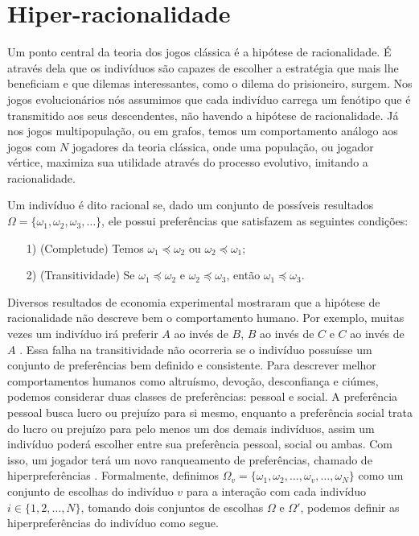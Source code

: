 \chapter{Hiper-racionalidade} \label{chap:hiperRacionalidade}

Um ponto central da teoria dos jogos clássica é a hipótese de racionalidade. É através dela que os indivíduos são capazes de escolher a estratégia que mais lhe beneficiam e que dilemas interessantes, como o dilema do prisioneiro, surgem. Nos jogos evolucionários nós assumimos que cada indivíduo carrega um fenótipo que é transmitido aos seus descendentes, não havendo a hipótese de racionalidade. Já nos jogos multipopulação, ou em grafos, temos um comportamento análogo aos jogos com $N$ jogadores da teoria clássica, onde uma população, ou jogador vértice, maximiza sua utilidade através do processo evolutivo, imitando a racionalidade.

\begin{definition}
    \label{defRacionalidade}
    Um indivíduo é dito racional se, dado um conjunto de possíveis resultados $\Omega=\{\omega_1,\omega_2,\omega_3,\dots\}$, ele possui preferências que satisfazem as seguintes condições:
    \begin{itemize}
        \item[1)] (Completude) Temos $\omega_1\preceq\omega_2$ ou $\omega_2\preceq\omega_1$;
        \item[2)] (Transitividade) Se $\omega_1\preceq\omega_2$ e $\omega_2\preceq\omega_3$, então $\omega_1\preceq\omega_3$.
    \end{itemize}
\end{definition}

Diversos resultados de economia experimental mostraram que a hipótese de racionalidade não descreve bem o comportamento humano. Por exemplo, muitas vezes um indivíduo irá preferir $A$ ao invés de $B$, $B$ ao invés de $C$ e $C$ ao invés de $A$ \cite{sep-game-evolutionary}. Essa falha na transitividade não ocorreria se o indivíduo possuísse um conjunto de preferências bem definido e consistente. Para descrever melhor comportamentos humanos como altruísmo, devoção, desconfiança e ciúmes, podemos considerar duas classes de preferências: pessoal e social. A preferência pessoal busca lucro ou prejuízo para si mesmo, enquanto a preferência social trata do lucro ou prejuízo para pelo menos um dos demais indivíduos, assim um indivíduo poderá escolher entre sua preferência pessoal, social ou ambas. Com isso, um jogador terá um novo ranqueamento de preferências, chamado de hiperpreferências \cite{askari2019behavioral}. Formalmente, definimos $\Omega_v=\{\omega_1,\omega_2,\dots,\omega_v,\dots,\omega_N\}$ como um conjunto de escolhas do indivíduo $v$ para a interação com cada indivíduo $i\in\{1,2,\dots,N\}$, tomando dois conjuntos de escolhas $\Omega$ e $\Omega'$, podemos definir as hiperpreferências do indivíduo como segue.

